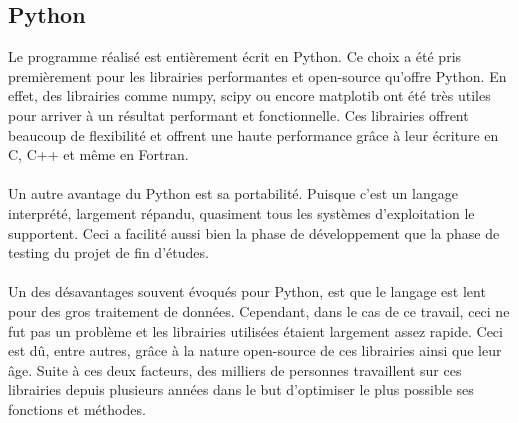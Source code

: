 \documentclass[11pt]{article}
\begin{document}
\subsection{Python}

Le programme réalisé est entièrement écrit en Python.
Ce choix a été pris premièrement pour les librairies performantes et open-source qu'offre Python.
En effet, des librairies comme numpy, scipy ou encore matplotib ont été très utiles pour arriver à un résultat performant et fonctionnelle.
Ces librairies offrent beaucoup de flexibilité et offrent une haute performance grâce à leur écriture en C, C++ et même en Fortran.\\
\\
Un autre avantage du Python est sa portabilité.
Puisque c'est un langage interprété, largement répandu, quasiment tous les systèmes d'exploitation le supportent.
Ceci a facilité aussi bien la phase de développement que la phase de testing du projet de fin d'études.\\
\\
Un des désavantages souvent évoqués pour Python, est que le langage est lent pour des gros traitement de données.
Cependant, dans le cas de ce travail, ceci ne fut pas un problème et les librairies utilisées étaient largement assez rapide.
Ceci est dû, entre autres, grâce à la nature open-source de ces librairies ainsi que leur âge.
Suite à ces deux facteurs, des milliers de personnes travaillent sur ces librairies depuis plusieurs années dans le but d'optimiser le plus possible ses fonctions et méthodes.

\end{document}
